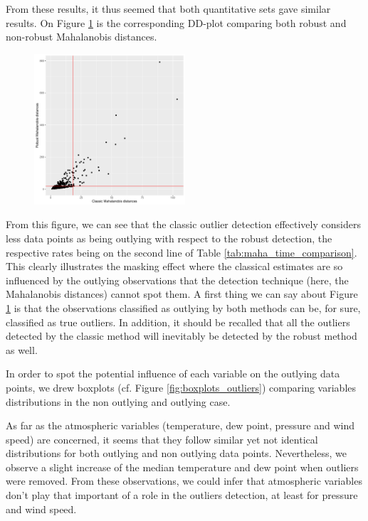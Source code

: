 \documentclass[a4paper, 12pt]{article}
\begin{document}
    From these results, it thus seemed that both quantitative sets gave similar results. On Figure \ref{fig:compare_maha} is the corresponding DD-plot comparing both robust and non-robust Mahalanobis distances.
    
    \begin{figure}
	    \centering
	    \includegraphics[width=0.5\textwidth]{resources/pdf/compare_maha_most_robust.pdf}
	    \label{fig:compare_maha}
	    \vspace{-0.5em}
	\end{figure}
    
    From this figure, we can see that the classic outlier detection effectively considers less data points as being outlying with respect to the robust detection, the respective rates being on the second line of Table \ref{tab:maha_time_comparison}. This clearly illustrates the masking effect where the classical estimates are so influenced by the outlying observations that the detection technique (here, the Mahalanobis distances) cannot spot them. A first thing we can say about Figure \ref{fig:compare_maha} is that the observations classified as outlying by both methods can be, for sure, classified as true outliers. In addition, it should be recalled that all the outliers detected by the classic method will inevitably be detected by the robust method as well. 
    
    In order to spot the potential influence of each variable on the outlying data points, we drew boxplots (cf. Figure \ref{fig:boxplots_outliers}) comparing variables distributions in the non outlying and outlying case.

    As far as the atmospheric variables (temperature, dew point, pressure and wind speed) are concerned, it seems that they follow similar yet not identical distributions for both outlying and non outlying data points. Nevertheless, we observe a slight increase of the median temperature and dew point when outliers were removed. From these observations, we could infer that atmospheric variables don't play that important of a role in the outliers detection, at least for pressure and wind speed.
    
\end{document}
